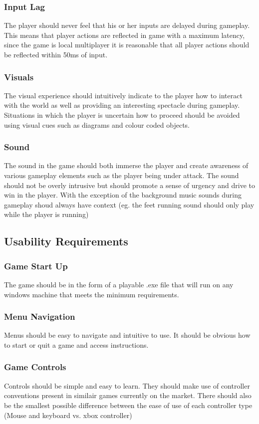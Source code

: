 \documentclass[11pt,a4paper]{article}
\begin{document}
\subsubsection{Input Lag}
The player should never feel that his or her inputs are delayed during gameplay. This means that player actions are reflected in game with a maximum latency, since the game is local multiplayer it is reasonable that all player actions should be reflected within 50ms of input.
\subsubsection{Visuals}
The visual experience should intuitively indicate to the player how to interact with the world as well as providing an interesting spectacle during gameplay. Situations in which the player is uncertain how to proceed should be avoided using visual cues such as diagrams and colour coded objects.
\subsubsection{Sound}
The sound in the game should both immerse the player and create awareness of various gameplay elements such as the player being under attack. The sound should not be overly intrusive but should promote a sense of urgency and drive to win in the player. With the exception of the background music sounds during gameplay shoud always have context (eg. the feet running sound should only play while the player is running)
\subsection{Usability Requirements}
\subsubsection{Game Start Up}
The game should be in the form of a playable .exe file that will run on any windows machine that meets the minimum requirements.
\subsubsection{Menu Navigation}
Menus should be easy to navigate and intuitive to use. It should be obvious how to start or quit a game and access instructions.
\subsubsection{Game Controls}
Controls should be simple and easy to learn. They should make use of controller conventions present in similair games currently on the market. There should also be the smallest possible difference between the ease of use of each controller type (Mouse and keyboard vs. xbox controller)
\end{document}
